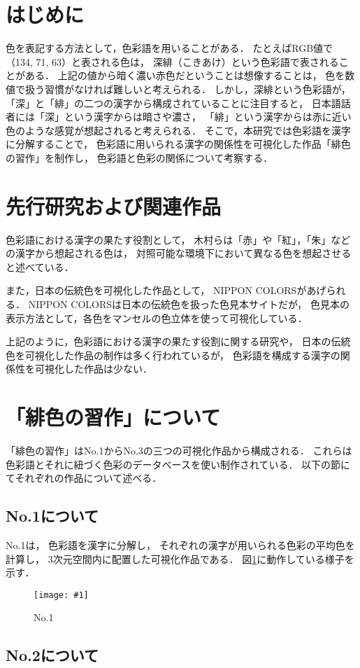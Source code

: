 \documentclass[a4j,twocolumn]{ujarticle} %
\newcommand{\workname}{緋色の習作}
\newcommand{\colorname}{色彩語}
\newcommand{\mysection}[1]{\vspace{-20pt}\section{#1}}
\newcommand{\mysubsection}[1]{\vspace{-12pt}\subsection{#1}}
\newcommand{\myfigure}[3]{
\begin{figure}[htbp]
  \begin{center}
    \texttt{[image: \#1]}
    \caption{#2}
    \label{#3}
  \end{center}
\end{figure}
\vspace{-3zh}
}
\begin{document}
\maketitle
\thispagestyle{myheadings}

\mysection{はじめに}

色を表記する方法として，\colorname{}を用いることがある．
たとえばRGB値で（134, 71, 63）と表される色は，
深緋（こきあけ）という\colorname{}で表されることがある．
上記の値から暗く濃い赤色だということは想像することは，
色を数値で扱う習慣がなければ難しいと考えられる．
しかし，深緋という\colorname{}が，
「深」と「緋」の二つの漢字から構成されていることに注目すると，
日本語話者には「深」という漢字からは暗さや濃さ，
「緋」という漢字からは赤に近い色のような感覚が想起されると考えられる．
そこで，本研究では\colorname{}を漢字に分解することで，
\colorname{}に用いられる漢字の関係性を可視化した作品「\workname{}」を制作し，
\colorname{}と色彩の関係について考察する．

\mysection{先行研究および関連作品}

色彩語における漢字の果たす役割として，
木村ら\cite{Kimura1998}は「赤」や「紅」，「朱」などの漢字から想起される色は，
対照可能な環境下において異なる色を想起させると述べている．

また，日本の伝統色を可視化した作品として，
NIPPON COLORS\cite{NipponColors}があげられる．
NIPPON COLORSは日本の伝統色を扱った色見本サイトだが，
色見本の表示方法として，各色をマンセルの色立体を使って可視化している．

上記のように，色彩語における漢字の果たす役割に関する研究や，
日本の伝統色を可視化した作品の制作は多く行われているが，
色彩語を構成する漢字の関係性を可視化した作品は少ない．

\section{「\workname{}」について}

「\workname{}」はNo.1からNo.3の三つの可視化作品から構成される．
これらは\colorname{}とそれに紐づく色彩のデータベースを使い制作されている．
以下の節にてそれぞれの作品について述べる．

\mysubsection{No.1について}

No.1は，
\colorname{}を漢字に分解し，
それぞれの漢字が用いられる色彩の平均色を計算し，
3次元空間内に配置した可視化作品である．
図\ref{no1}に動作している様子を示す．

\myfigure{fig/kanji-color-space.eps}{No.1}{no1}

\mysubsection{No.2について}
\end{document}
